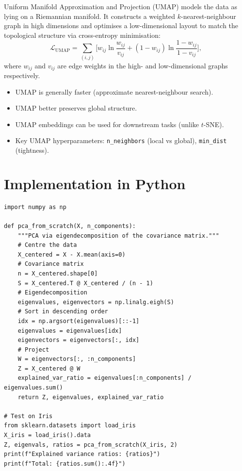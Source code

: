 \begin{definition}[UMAP]
Uniform Manifold Approximation and Projection (UMAP) models the data as lying on a Riemannian manifold. It constructs a weighted $k$-nearest-neighbour graph in high dimensions and optimises a low-dimensional layout to match the topological structure via cross-entropy minimisation:
\[
  \mathcal{L}_{\text{UMAP}} = \sum_{(i,j)} \bigl[w_{ij}\ln\frac{w_{ij}}{v_{ij}} + (1-w_{ij})\ln\frac{1-w_{ij}}{1-v_{ij}}\bigr],
\]
where $w_{ij}$ and $v_{ij}$ are edge weights in the high- and low-dimensional graphs respectively.
\end{definition}

\begin{bestpractice}[title=\textbf{$t$-SNE vs UMAP}]
\begin{itemize}
  \item UMAP is generally faster (approximate nearest-neighbour search).
  \item UMAP better preserves global structure.
  \item UMAP embeddings can be used for downstream tasks (unlike $t$-SNE).
  \item Key UMAP hyperparameters: \texttt{n\_neighbors} (local vs global), \texttt{min\_dist} (tightness).
\end{itemize}
\end{bestpractice}

\section{Implementation in Python}

\begin{codeblock}[title=\textbf{PCA from Scratch}]
\begin{verbatim}
import numpy as np

def pca_from_scratch(X, n_components):
    """PCA via eigendecomposition of the covariance matrix."""
    # Centre the data
    X_centered = X - X.mean(axis=0)
    # Covariance matrix
    n = X_centered.shape[0]
    S = X_centered.T @ X_centered / (n - 1)
    # Eigendecomposition
    eigenvalues, eigenvectors = np.linalg.eigh(S)
    # Sort in descending order
    idx = np.argsort(eigenvalues)[::-1]
    eigenvalues = eigenvalues[idx]
    eigenvectors = eigenvectors[:, idx]
    # Project
    W = eigenvectors[:, :n_components]
    Z = X_centered @ W
    explained_var_ratio = eigenvalues[:n_components] / eigenvalues.sum()
    return Z, eigenvalues, explained_var_ratio

# Test on Iris
from sklearn.datasets import load_iris
X_iris = load_iris().data
Z, eigenvals, ratios = pca_from_scratch(X_iris, 2)
print(f"Explained variance ratios: {ratios}")
print(f"Total: {ratios.sum():.4f}")
\end{verbatim}
\end{codeblock}

